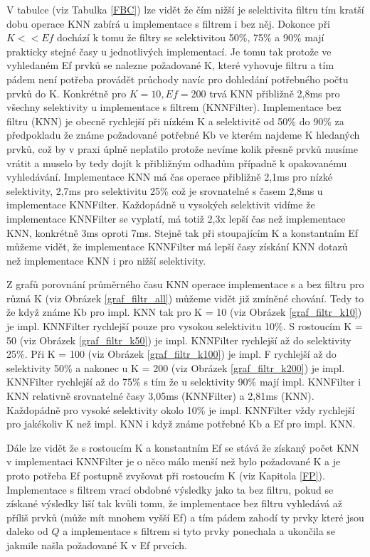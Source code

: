 \documentclass[czech,semestral,dept460,male,csharp,cpdeclaration]{diploma}
\begin{document}
		V tabulce (viz Tabulka \ref{FBC}) lze vidět že čím nižší je selektivita filtru tím kratší dobu operace KNN zabírá u implementace s filtrem i bez něj. Dokonce při $K << Ef$ dochází k tomu že filtry se selektivitou 50\%, 75\% a 90\% mají prakticky stejné časy u jednotlivých implementací. Je tomu tak protože ve vyhledaném Ef prvků se nalezne požadované K, které vyhovuje filtru a tím pádem není potřeba provádět průchody navíc pro dohledání potřebného počtu prvků do K. Konkrétně pro $K = 10, Ef = 200$ trvá KNN přibližně 2,8ms pro všechny selektivity u implementace s filtrem (KNNFilter). Implementace bez filtru (KNN) je obecně rychlejší při nízkém K a selektivitě od 50\% do 90\% za předpokladu že známe požadované potřebné Kb ve kterém najdeme K hledaných prvků, což by v praxi úplně neplatilo protože nevíme kolik přesně prvků musíme vrátit a muselo by tedy dojít k přibližným odhadům případně k opakovanému vyhledávání. Implementace KNN má čas operace přibližně 2,1ms pro nízké selektivity, 2,7ms pro selektivitu 25\% což je srovnatelné s časem 2,8ms u implementace KNNFilter. Každopádně u vysokých selektivit vidíme že implementace KNNFilter se vyplatí, má totiž 2,3x lepší čas než implementace KNN, konkrétně 3ms oproti 7ms. Stejně tak při stoupajícím K a konstantním Ef můžeme vidět, že implementace KNNFilter má lepší časy získání KNN dotazů než implementace KNN i pro nižší selektivity.
		
		Z grafů porovnání průměrného času KNN operace implementace s a bez filtru pro různá K (viz Obrázek \ref{graf_filtr_all}) můžeme vidět již zmíněné chování. Tedy to že když známe Kb pro impl. KNN tak pro K = 10 (viz Obrázek \ref{graf_filtr_k10}) je impl. KNNFilter rychlejší pouze pro vysokou selektivitu 10\%. S rostoucím K = 50 (viz Obrázek \ref{graf_filtr_k50}) je impl. KNNFilter rychlejší až do selektivity  25\%. Při K = 100 (viz Obrázek \ref{graf_filtr_k100}) je impl. F rychlejší až do selektivity 50\% a nakonec u K = 200 (viz Obrázek \ref{graf_filtr_k200}) je impl. KNNFilter rychlejší až do 75\% s tím že u selektivity 90\% mají impl. KNNFilter i KNN relativně srovnatelné časy 3,05ms (KNNFilter) a 2,81ms (KNN). Každopádně pro vysoké selektivity okolo 10\% je impl. KNNFilter vždy rychlejší pro jakékoliv K než impl. KNN i když známe potřebné Kb a Ef pro impl. KNN.
		
		Dále lze vidět že s rostoucím K a konstantním Ef se stává že získaný počet KNN v implementaci KNNFilter je o něco málo menší než bylo požadované K a je proto potřeba Ef postupně zvyšovat při rostoucím K (viz Kapitola \ref{FP}). Implementace s filtrem vrací obdobné výsledky jako ta bez filtru, pokud se získané výsledky liší tak kvůli tomu, že implementace bez filtru vyhledává až příliš prvků (může mít mnohem vyšší Ef) a tím pádem zahodí ty prvky které jsou daleko od $Q$ a implementace s filtrem si tyto prvky ponechala a ukončila se jakmile našla požadované K v Ef prvcích.
		
\end{document}
